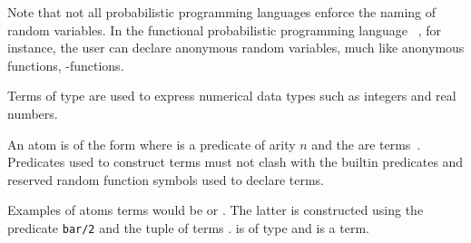 Note that not all probabilistic programming languages enforce the naming of random variables. In the functional probabilistic programming language \anglicansty~\citep{wood2014approach}, for instance, the user can declare anonymous random variables, much like anonymous functions, \ie \textlambda-functions.

\begin{definition} Terms of type  are used to express numerical data types such as integers and real numbers.	
\end{definition}


 

\begin{definition}
	An atom is of the form  where  is a predicate of arity $n$ and the  are  terms~\citep{fierens2015inference}. Predicates used to construct  terms must not clash with the builtin predicates and reserved random function symbols used to declare  terms.
\end{definition}

Examples of atoms terms would be  or . The latter is constructed using the predicate \lstinline{bar/2} and the tuple of  terms .  is of type  and  is a  term.







